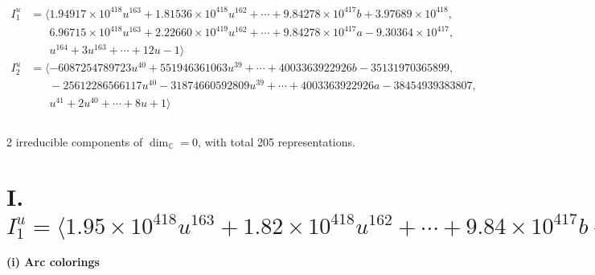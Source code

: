 \documentclass[1p]{elsarticle_modified}
\theoremstyle{definition}
\begin{document}
\begin{align*}
I^u_{1}&=\langle 
1.94917\times10^{418} u^{163}+1.81536\times10^{418} u^{162}+\cdots+9.84278\times10^{417} b+3.97689\times10^{418},\\
\phantom{I^u_{1}}&\phantom{= \langle  }6.96715\times10^{418} u^{163}+2.22660\times10^{419} u^{162}+\cdots+9.84278\times10^{417} a-9.30364\times10^{417},\\
\phantom{I^u_{1}}&\phantom{= \langle  }u^{164}+3 u^{163}+\cdots+12 u-1\rangle \\
I^u_{2}&=\langle 
-6087254789723 u^{40}+551946361063 u^{39}+\cdots+4003363922926 b-35131970365899,\\
\phantom{I^u_{2}}&\phantom{= \langle  }-25612286566117 u^{40}-31874660592809 u^{39}+\cdots+4003363922926 a-38454939383807,\\
\phantom{I^u_{2}}&\phantom{= \langle  }u^{41}+2 u^{40}+\cdots+8 u+1\rangle \\
\\
\end{align*}
\raggedright * 2 irreducible components of $\dim_{\mathbb{C}}=0$, with total 205 representations.\\
\newpage
\renewcommand{\arraystretch}{1}
\centering \section*{I. $I^u_{1}= \langle 1.95\times10^{418} u^{163}+1.82\times10^{418} u^{162}+\cdots+9.84\times10^{417} b+3.98\times10^{418},\;6.97\times10^{418} u^{163}+2.23\times10^{419} u^{162}+\cdots+9.84\times10^{417} a-9.30\times10^{417},\;u^{164}+3 u^{163}+\cdots+12 u-1 \rangle$}
\flushleft \textbf{(i) Arc colorings}\\
\end{document}
